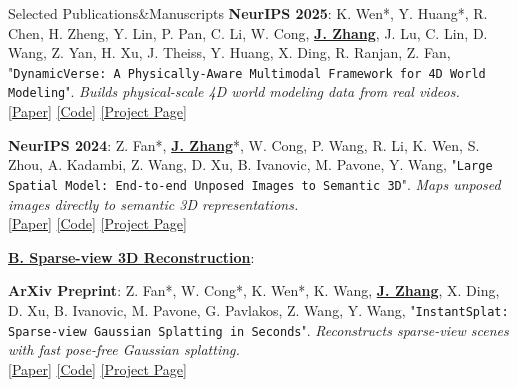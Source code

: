 \documentclass{resume} %
\begin{document}
\begin{rSection}{Selected Publications\&Manuscripts}
{\bf NeurIPS 2025}: K. Wen*, Y. Huang*, R. Chen, H. Zheng, Y. Lin, P. Pan, C. Li, W. Cong, \underline{\textbf{J. Zhang}}, J. Lu, C. Lin, D. Wang, Z. Yan, H. Xu, J. Theiss, Y. Huang, X. Ding, R. Ranjan, Z. Fan,
"{\texttt{DynamicVerse: A Physically-Aware Multimodal Framework for 4D World Modeling}}". {\footnotesize\emph{Builds physical-scale 4D world modeling data from real videos.}}\\
\hspace{1em}
{\color{BlueViolet}
\href{https://arxiv.org/pdf/2512.03000}{[\underline{Paper}]}\hspace{1em}
\href{https://github.com/Dynamics-X/DynamicVerse}{[\underline{Code}]}\hspace{1em}
\href{https://dynamic-verse.github.io/}{[\underline{Project Page}]}}
\vspace{-1mm}

{ {\bf NeurIPS 2024}}: Z. Fan*, \underline{\textbf{J. Zhang}}*, W. Cong, P. Wang, R. Li, K. Wen, S. Zhou, A. Kadambi, Z. Wang, D. Xu, B. Ivanovic, M. Pavone, Y. Wang,
 "{\texttt{Large Spatial Model: End-to-end Unposed Images to Semantic 3D}}". {\footnotesize\emph{Maps unposed images directly to semantic 3D representations.}}\\
\hspace{1em} {\color{BlueViolet} \href{https://arxiv.org/abs/2410.18956}{[\underline{Paper}]} \hspace{1em} \href{https://github.com/NVlabs/LSM}{[\underline{Code}]} \hspace{1em} \href{https://largespatialmodel.github.io/}{[\underline{Project Page}]}} \hspace{1em}
\vspace{-1mm}

\textbf{\underline{B. Sparse-view 3D Reconstruction}}:

{ {\bf ArXiv Preprint}}: Z. Fan*, W. Cong*, K. Wen*, K. Wang, \underline{\textbf{J. Zhang}}, X. Ding, D. Xu, B. Ivanovic, M. Pavone, G. Pavlakos, Z. Wang, Y. Wang,
 "{\texttt{InstantSplat: Sparse-view Gaussian Splatting in Seconds}}". {\footnotesize\emph{Reconstructs sparse-view scenes with fast pose-free Gaussian splatting.}}\\
\hspace{1em} {\color{BlueViolet} \href{https://arxiv.org/abs/2403.20309}{[\underline{Paper}]} \hspace{1em} \href{https://github.com/NVlabs/InstantSplat}{[\underline{Code}]} \hspace{1em} \href{https://instantsplat.github.io/}{[\underline{Project Page}]}} \hspace{1em}
\vspace{-1mm}
 
\vspace{-1mm}
\end{rSection}
\fussy
\end{document}
